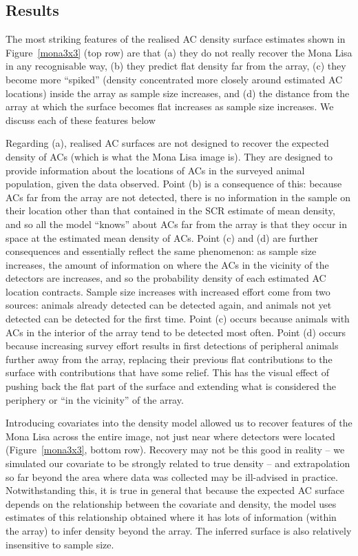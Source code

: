 \documentclass[useAMS,usenatbib,referee]{biom}
\begin{document}
\subsection{Results}
The most striking features of the realised AC density surface estimates shown in Figure~\ref{mona3x3} (top row) are that (a) they do not really recover the Mona Lisa in any recognisable way, (b) they predict flat density far from the array, (c) they become more ``spiked'' (density concentrated more closely around estimated AC locations) inside the array as sample size increases, and (d) the distance from the array at which the surface becomes flat increases as sample size increases. We discuss each of these features below

Regarding (a), realised AC surfaces are not designed to recover the expected density of ACs (which is what the Mona Lisa image is). They are designed to provide information about the locations of ACs in the surveyed animal population, given the data observed. Point (b) is a consequence of this: because ACs far from the array are not detected, there is no information in the sample on their location other than that contained in the SCR estimate of mean density, and so all the model ``knows'' about ACs far from the array is that they occur in space at the estimated mean density of ACs. Point (c) and (d) are further consequences and essentially reflect the same phenomenon: as sample size increases, the amount of information on where the ACs in the vicinity of the detectors are increases, and so the probability density of each estimated AC location contracts. Sample size increases with increased effort come from two sources: animals already detected can be detected again, and animals not yet detected can be detected for the first time. Point (c) occurs because animals with ACs in the interior of the array tend to be detected most often. Point (d) occurs because increasing survey effort results in first detections of peripheral animals further away from the array, replacing their previous flat contributions to the surface with contributions that have some relief. This has the visual effect of pushing back the flat part of the surface and extending what is considered the periphery or ``in the vicinity'' of the array. 

Introducing covariates into the density model allowed us to recover features of the Mona Lisa across the entire image, not just near where detectors were located (Figure~\ref{mona3x3}, bottom row). Recovery may not be this good in reality -- we simulated our covariate to be strongly related to true density -- and extrapolation so far beyond the area where data was collected may be ill-advised in practice. Notwithstanding this, it is true in general that because the expected AC surface depends on the relationship between the covariate and density, the model uses estimates of this relationship obtained where it has lots of information (within the array) to infer density beyond the array. The inferred surface is also relatively insensitive to sample size.
\end{document}
